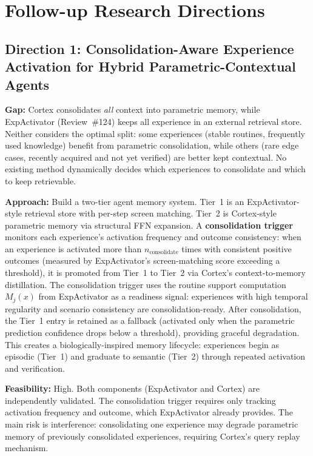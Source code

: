 \documentclass[11pt,a4paper]{article}
\begin{document}
\section{Follow-up Research Directions}

\subsection{Direction 1: Consolidation-Aware Experience Activation for Hybrid Parametric-Contextual Agents}
\textbf{Gap:} Cortex consolidates \emph{all} context into parametric memory, while ExpActivator (Review~\#124) keeps all experience in an external retrieval store. Neither considers the optimal split: some experiences (stable routines, frequently used knowledge) benefit from parametric consolidation, while others (rare edge cases, recently acquired and not yet verified) are better kept contextual. No existing method dynamically decides which experiences to consolidate and which to keep retrievable.

\textbf{Approach:} Build a two-tier agent memory system. Tier~1 is an ExpActivator-style retrieval store with per-step screen matching. Tier~2 is Cortex-style parametric memory via structural FFN expansion. A \textbf{consolidation trigger} monitors each experience's activation frequency and outcome consistency: when an experience is activated more than $n_{\text{consolidate}}$ times with consistent positive outcomes (measured by ExpActivator's screen-matching score exceeding a threshold), it is promoted from Tier~1 to Tier~2 via Cortex's context-to-memory distillation. The consolidation trigger uses the routine support computation $M_j(x)$ from ExpActivator as a readiness signal: experiences with high temporal regularity and scenario consistency are consolidation-ready. After consolidation, the Tier~1 entry is retained as a fallback (activated only when the parametric prediction confidence drops below a threshold), providing graceful degradation. This creates a biologically-inspired memory lifecycle: experiences begin as episodic (Tier~1) and graduate to semantic (Tier~2) through repeated activation and verification.

\textbf{Feasibility:} High. Both components (ExpActivator and Cortex) are independently validated. The consolidation trigger requires only tracking activation frequency and outcome, which ExpActivator already provides. The main risk is interference: consolidating one experience may degrade parametric memory of previously consolidated experiences, requiring Cortex's query replay mechanism.
\end{document}

